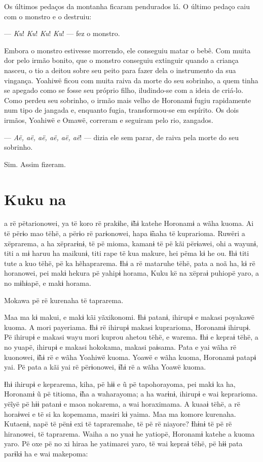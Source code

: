 Os últimos pedaços da montanha ficaram pendurados lá. O último pedaço
caiu com o monstro e o destruiu: 

--- \textit{Ku}! \textit{Ku}! \textit{Ku}! \textit{Ku}! --- fez o monstro. 

Embora o monstro estivesse morrendo, ele conseguiu matar o bebê. Com
muita dor pelo irmão bonito, que o monstro conseguiu extinguir quando a
criança nasceu, o tio a deitou sobre seu peito para fazer dela o
instrumento da sua vingança. Yoahiwë ficou com muita raiva da morte do
seu sobrinho, a quem tinha se apegado como se fosse seu próprio filho,
iludindo-se com a ideia de criá-lo. Como perdeu seu sobrinho, o irmão
mais velho de Horonamɨ fugiu rapidamente num tipo de jangada e, enquanto
fugia, transformou-se em espírito. Os dois irmãos, Yoahiwë e Omawë, correram e seguiram pelo rio, zangados.

--- \textit{Aë, aë, aë, aë, aë, aë}! --- dizia ele sem parar, de raiva pela morte
do seu sobrinho. 

Sim. Assim fizeram.

\chapter{Kuku na}
 
 a rë pëtarionowei, ya të koro rë prakɨhe, ɨ̃hɨ katehe Horonamɨ a
wãha kuoma. Ai të përɨo mao tëhë, a përɨo rë parɨonowei, hapa ɨ̃naha të
kuprarioma. Ruwëri a xëprarema, a ha xëprarɨnɨ, të pë mioma, kamanɨ të
pë kãi përɨawei, ohi a wayunɨ, titi a mɨ haruu ha maikunɨ, titi rape të
kua makure, hei pëma kɨ he ou. Ɨhɨ titi tute a kuo tëhë, pë ka
hẽhaprarema. Ɨhɨ a rë mataruhe tëhë, pata a noã ha, kɨ rë horanowei, pei
makɨ hekura pë yahipɨ horama, Kuku kë na xëpraɨ puhiopë yaro, a no
mɨhɨapë, e makɨ horama.

Mokawa pë rë kurenaha të taprarema. 

Maa ma kɨ makui, e makɨ kãi yãxikonomi. Ɨhɨ patanɨ, ihirupɨ e makasi
poyakawë kuoma. A mori payeriama. Ɨhɨ rë ihirupɨ makasi kuprarioma,
Horonamɨ ihirupɨ. Pë ihirupɨ e makasi wayu mori kuprou ahetou tëhë, e
warema. Ɨhɨ e kepraɨ tëhë, a no yuapë, ihirupɨ e makasi hokokama, makasi
paɨsama. Pata e yai wãha rë kuonowei, ɨ̃hɨ rë e wãha Yoahiwë kuoma. Yoawë
e wãha kuoma, Horonamɨ patapɨ yai. Pë pata a kãi yai rë përɨonowei, ɨ̃hɨ
rë a wãha Yoawë kuoma.

Ɨhɨ ihirupɨ e keprarema, kiha, pë hɨɨ e ũ pë tapohorayoma, pei makɨ ka
ha, Horonamɨ ũ pë titioma, ɨ̃ha a waharayoma; a ha warɨnɨ, ihirupɨ e wai
keprarioma. yëĩyë pë hɨɨ patanɨ e maoa nokarema, a wai horaximama. A kuaaɨ tëhë, a rë horaɨwei e të si ka kopemama, masiri kɨ yaima. Maa ma
komore kurenaha. Kutaenɨ, napë të pënɨ exi të tapraremahe, të pë rë
niayore? Ɨhɨnɨ të pë rë hiranowei, të taprarema. Waiha a no yuaɨ he
yatiopë, Horonamɨ katehe a kuoma yaro. Pë oxe pë no xi hiraa he
yatimarei yaro, të wai kepraɨ tëhë, pë hɨɨ pata parɨkɨ ha e wai
makepoma:


